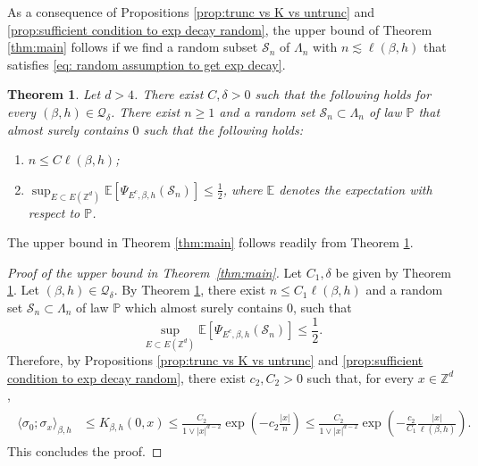 \documentclass[11pt,a4paper]{article}
\numberwithin{equation}{section}
\theoremstyle{plain}
\newtheorem{Thm}{Theorem}[section]
\theoremstyle{definition}
\begin{document}
As a consequence of Propositions \ref{prop:trunc vs K vs untrunc} and \ref{prop:sufficient condition to exp decay random}, the upper bound of Theorem \ref{thm:main} follows if we find a random subset $\mathcal S_n$ of $\Lambda_n$ with $n\lesssim \ell(\beta,h)$ that satisfies \eqref{eq: random assumption to get exp decay}.

\begin{Thm}\label{thm:finding the good random S} Let $d>4$. There exist $C,\delta >0$ such that the following holds for every $(\beta,h)\in \mathcal Q_\delta$. There exist $n\geq 1$ and a random set $\mathcal S_n\subset \Lambda_n$ of law $\mathbb P$ that almost surely contains $0$ such that the following holds:
\begin{enumerate}
	\item[$(i)$] $n\leq C\ell(\beta,h)$;
	\item[$(ii)$] $\sup_{E\subset E(\mathbb Z^d)}\mathbb E[\Psi_{E^c,\beta,h}(\mathcal S_n)]\leq \tfrac{1}{2}$, where $\mathbb E$ denotes the expectation with respect to $\mathbb P$.
\end{enumerate}
\end{Thm}
 
The upper bound in Theorem \ref{thm:main} follows readily from Theorem \ref{thm:finding the good random S}.
 \begin{proof}[Proof of the upper bound in Theorem~\textup{\ref{thm:main}}] Let $C_1,\delta$ be given by Theorem \ref{thm:finding the good random S}. Let $(\beta,h)\in \mathcal Q_\delta$. By Theorem \ref{thm:finding the good random S}, there exist $n\leq C_1\ell(\beta,h)$ and a random set $\mathcal S_n\subset \Lambda_n$ of law $\mathbb P$ which almost surely contains $0$, such that
 \begin{equation}
 	\sup_{E\subset E(\mathbb Z^d)}\mathbb E[\Psi_{E^c,\beta,h}(\mathcal S_n)]\leq \frac{1}{2}.
 \end{equation}
Therefore, by Propositions \ref{prop:trunc vs K vs untrunc} and \ref{prop:sufficient condition to exp decay random}, there exist $c_2,C_2>0$ such that, for every $x\in \mathbb Z^d$,
 \begin{align}\label{eq:proof upper bound 1}
 \begin{aligned}
	\langle \sigma_0;\sigma_x\rangle_{\beta,h}&\leq K_{\beta,h}(0,x)\leq \frac{C_2}{1\vee |x|^{d-2}}\exp\left(-c_2\frac{|x|}{n}\right)\leq \frac{C_2}{1\vee |x|^{d-2}}\exp\left(-\frac{c_2}{C_1}\frac{|x|}{\ell(\beta,h)}\right).
	\end{aligned}
\end{align}
This concludes the proof.
\end{proof}
\end{document}
